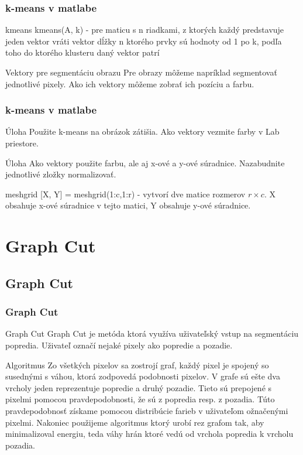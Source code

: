 \documentclass{beamer}
\begin{document}
\begin{frame}
\frametitle{k-means v matlabe}
\begin{block}{kmeans}
kmeans(A, k) - pre maticu s n riadkami, z ktorých každý predstavuje jeden vektor vráti vektor dĺžky n ktorého prvky sú hodnoty od 1 po k, podľa toho do ktorého klusteru daný vektor patrí
\end{block}

\begin{block}{Vektory pre segmentáciu obrazu}
Pre obrazy môžeme napríklad segmentovať jednotlivé pixely. Ako ich vektory môžeme zobrať ich pozíciu a farbu.
\end{block}
\end{frame}

\begin{frame}
\frametitle{k-means v matlabe}
\begin{block}{Úloha}
Použite k-means na obrázok zátišia. Ako vektory vezmite farby v Lab priestore.
\end{block}

\begin{block}{Úloha}
Ako vektory použite farbu, ale aj x-ové a y-ové súradnice. Nazabudnite jednotlivé zložky normalizovať.
\end{block}


\begin{block}{meshgrid}
[X, Y] = meshgrid(1:c,1:r) - vytvorí dve matice rozmerov $r \times c$. X obsahuje x-ové súradnice v tejto matici, Y obsahuje y-ové súradnice.
\end{block}
\end{frame}

\section{Graph Cut}
\subsection{Graph Cut}

\begin{frame}
\frametitle{Graph Cut}
\begin{block}{Graph Cut}
Graph Cut je metóda ktorá využíva uživateľský vstup na segmentáciu popredia. Uživateľ označí nejaké pixely ako popredie a pozadie.
\end{block}

\begin{block}{Algoritmus}
Zo všetkých pixelov sa zostrojí graf, každý pixel je spojený so susednými s váhou, ktorá zodpovedá podobnosti pixelov. V grafe sú ešte dva vrcholy jeden reprezentuje popredie a druhý pozadie. Tieto sú prepojené s pixelmi pomocou pravdepodobnosti, že sú z popredia resp. z pozadia. Túto pravdepodobnosť získame pomocou distribúcie farieb v uživateľom ožnačenými pixelmi.  Nakoniec použijeme algoritmus ktorý urobí rez grafom tak, aby minimalizoval energiu, teda váhy hrán ktoré vedú od vrchola popredia k vrcholu pozadia.
\end{block}

\end{frame}
\end{document}
